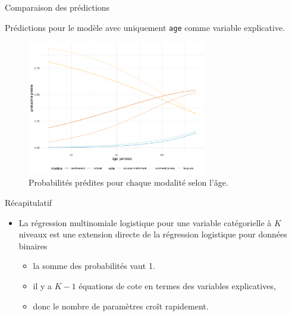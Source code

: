 \documentclass[
  ignorenonframetext,
]{beamer}
\providecommand{\tightlist}{%
  \setlength{\itemsep}{0pt}\setlength{\parskip}{0pt}}\usepackage{longtable,booktabs,array}
\begin{document}
\begin{frame}[fragile]{Comparaison des prédictions}
\protect\hypertarget{comparaison-des-pruxe9dictions}{}
\footnotesize

Prédictions pour le modèle avec uniquement \texttt{age} comme variable
explicative.

\begin{figure}

{\centering \includegraphics[width=0.7\textwidth,height=\textheight]{MATH60602-diapos7_files/figure-beamer/fig-predmultinom-1.pdf}

}

\caption{\label{fig-predmultinom}Probabilités prédites pour chaque
modalité selon l'âge.}

\end{figure}

\normalsize
\end{frame}

\begin{frame}{Récapitulatif}
\protect\hypertarget{ruxe9capitulatif-2}{}
\begin{itemize}
\tightlist
\item
  La régression multinomiale logistique pour une variable catégorielle à
  \(K\) niveaux est une extension directe de la régression logistique
  pour données binaires

  \begin{itemize}
  \tightlist
  \item
    la somme des probabilités vaut 1.
  \item
    il y a \(K-1\) équations de cote en termes des variables
    explicatives,
  \item
    donc le nombre de paramètres croît rapidement.
  \end{itemize}
\end{itemize}
\end{frame}
\end{document}
